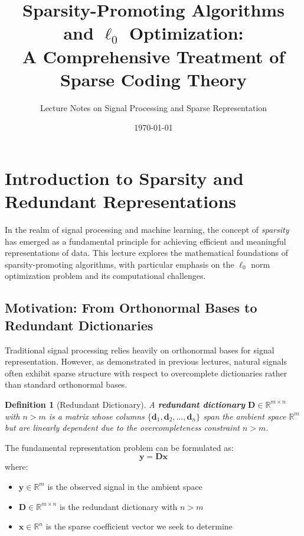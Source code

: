\documentclass[12pt]{article}
\title{Sparsity-Promoting Algorithms and $\ell_0$ Optimization: \\
A Comprehensive Treatment of Sparse Coding Theory}
\author{Lecture Notes on Signal Processing and Sparse Representation}
\date{\today}
\newtheorem{definition}[theorem]{Definition}
\begin{document}
\maketitle

\tableofcontents
\newpage

\section{Introduction to Sparsity and Redundant Representations}

In the realm of signal processing and machine learning, the concept of \textit{sparsity} has emerged as a fundamental principle for achieving efficient and meaningful representations of data. This lecture explores the mathematical foundations of sparsity-promoting algorithms, with particular emphasis on the $\ell_0$ norm optimization problem and its computational challenges.

\subsection{Motivation: From Orthonormal Bases to Redundant Dictionaries}

Traditional signal processing relies heavily on orthonormal bases for signal representation. However, as demonstrated in previous lectures, natural signals often exhibit sparse structure with respect to overcomplete dictionaries rather than standard orthonormal bases.

\begin{definition}[Redundant Dictionary]\label{def:redundant_dict}
    A \textbf{redundant dictionary} $\mathbf{D} \in \mathbb{R}^{m \times n}$ with $n > m$ is a matrix whose columns $\{\mathbf{d}_1, \mathbf{d}_2, \ldots, \mathbf{d}_n\}$ span the ambient space $\mathbb{R}^m$ but are linearly dependent due to the overcompleteness constraint $n > m$.
\end{definition}

The fundamental representation problem can be formulated as:
\begin{equation}\label{eq:basic_representation}
    \mathbf{y} = \mathbf{D}\mathbf{x}
\end{equation}
where:
\begin{itemize}
    \item $\mathbf{y} \in \mathbb{R}^m$ is the observed signal in the ambient space
    \item $\mathbf{D} \in \mathbb{R}^{m \times n}$ is the redundant dictionary with $n > m$
    \item $\mathbf{x} \in \mathbb{R}^n$ is the sparse coefficient vector we seek to determine
\end{itemize}
\end{document}
